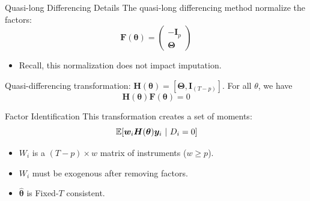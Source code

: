 \documentclass[aspectratio=169,t,11pt]{beamer}
\begin{document}
\begin{frame}{Quasi-long Differencing Details}\label{slide:appendix-qld_details}
  The quasi-long differencing method \citet{Ahn_Lee_Schmidt_2013} normalize the factors:
  \begin{equation*}
    \bm{F}(\bm{\theta}) = 
    \begin{pmatrix}
        -\bm I_p \\
        \bm \Theta
    \end{pmatrix}
  \end{equation*}

  \begin{itemize}
    \item Recall, this normalization does not impact imputation.
  \end{itemize}

  Quasi-differencing transformation: $\bm H(\bm \theta) = [\bm \Theta, \bm I_{(T-p)}]$. For all $\theta$, we have
  $$
    \bm{H}(\bm{\theta}) \bm{F}(\bm{\theta}) = 0
  $$

\end{frame}

\begin{frame}{Factor Identification}
  This transformation creates a set of moments:
  $$
    \expec{\bm{w}_i \bm{H}(\bm{\theta}) \bm{y}_i}{D_i = 0}
  $$

  \begin{itemize}
    \item $W_i$ is a $(T - p) \times w$ matrix of instruments ($w \geq p$).
    \item $W_i$ must be exogenous after removing factors.
    \item $\hat{\bm{\theta}}$ is Fixed-$T$ consistent.
  \end{itemize}

\end{frame}
\end{document}
